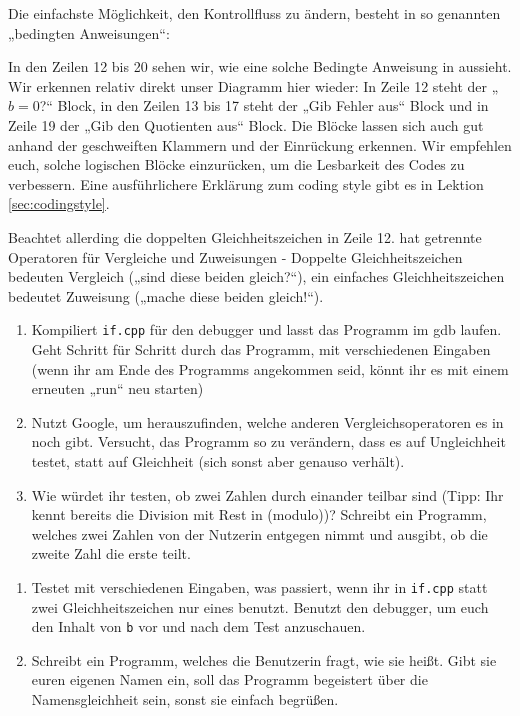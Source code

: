 Die einfachste Möglichkeit, den Kontrollfluss zu ändern, besteht in so
genannten „bedingten Anweisungen“:

In den Zeilen 12 bis 20 sehen wir, wie eine solche Bedingte Anweisung in \Cpp
aussieht. Wir erkennen relativ direkt unser Diagramm hier wieder: In Zeile 12
steht der „$b=0$?“ Block, in den Zeilen 13 bis 17 steht der „Gib Fehler aus“
Block und in Zeile 19 der „Gib den Quotienten aus“ Block. Die Blöcke lassen sich auch gut anhand der geschweiften Klammern und der Einrückung erkennen. Wir empfehlen euch, solche logischen Blöcke einzurücken, um die Lesbarkeit des Codes zu verbessern. Eine ausführlichere Erklärung zum coding style gibt es in Lektion \ref{sec:codingstyle}.

Beachtet allerding die doppelten Gleichheitszeichen in Zeile 12. \Cpp hat
getrennte Operatoren für Vergleiche und Zuweisungen - Doppelte
Gleichheitszeichen bedeuten Vergleich („sind diese beiden gleich?“), ein
einfaches Gleichheitszeichen bedeutet Zuweisung („mache diese beiden gleich!“).

\begin{praxis}
      \begin{enumerate}
            \item Kompiliert \texttt{if.cpp} für den debugger und lasst das Programm im
                  gdb laufen. Geht Schritt für Schritt durch das Programm, mit
                  verschiedenen Eingaben (wenn ihr am Ende des Programms angekommen seid,
                  könnt ihr es mit einem erneuten „run“ neu starten)
            \item Nutzt Google, um herauszufinden, welche anderen Vergleichsoperatoren
                  es in \Cpp noch gibt. Versucht, das Programm so zu verändern, dass es
                  auf Ungleichheit testet, statt auf Gleichheit (sich sonst aber genauso
                  verhält).
            \item Wie würdet ihr testen, ob zwei Zahlen durch einander teilbar sind
                  (Tipp: Ihr kennt bereits die Division mit Rest in \Cpp (modulo))?
                  Schreibt ein Programm, welches zwei Zahlen von der Nutzerin entgegen
                  nimmt und ausgibt, ob die zweite Zahl die erste teilt.
      \end{enumerate}
\end{praxis}

\begin{spiel}
\begin{enumerate}
    \item Testet mit verschiedenen Eingaben, was passiert, wenn ihr in
        \texttt{if.cpp} statt zwei Gleichheitszeichen nur eines benutzt.
        Benutzt den debugger, um euch den Inhalt von \texttt{b} vor und nach
        dem Test anzuschauen.
    \item Schreibt ein Programm, welches die Benutzerin fragt, wie sie heißt.
        Gibt sie euren eigenen Namen ein, soll das Programm begeistert über die
        Namensgleichheit sein, sonst sie einfach begrüßen.
\end{enumerate}
\end{spiel}

